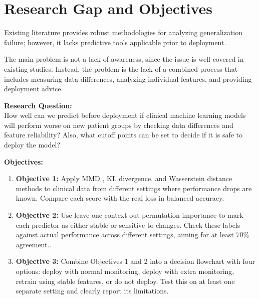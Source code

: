 \section{Research Gap and Objectives}

Existing literature provides robust methodologies for analyzing generalization failure; however, it lacks predictive tools applicable prior to deployment.

The main problem is not a lack of awareness, since the issue is well covered in existing studies. Instead, the problem is the lack of a combined process that includes measuring data differences, analyzing individual features, and providing deployment advice.

\textbf{Research Question:}\\
How well can we predict before deployment if clinical machine learning models will perform worse on new patient groups by checking data differences and feature reliability? Also, what cutoff points can be set to decide if it is safe to deploy the model?

\textbf{Objectives:}

\begin{enumerate}
    \item \textbf{Objective 1:} Apply MMD \cite{gretton2012kernel}, KL divergence, and Wasserstein distance methods \cite{duchi2018learning, rahimian2019dro} to clinical data from different settings where performance drops are known. Compare each score with the real loss in balanced accuracy.
    
    \item \textbf{Objective 2:} Use leave-one-context-out permutation importance \cite{whalen2022pitfalls} to mark each predictor as either stable or sensitive to changes. Check these labels against actual performance across different settings, aiming for at least 70\% agreement..
    
    \item \textbf{Objective 3:} Combine Objectives 1 and 2 into a decision flowchart with four options: deploy with normal monitoring, deploy with extra monitoring, retrain using stable features, or do not deploy. Test this on at least one separate setting and clearly report its limitations.
\end{enumerate}
